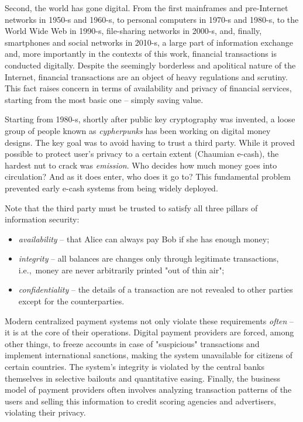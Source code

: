 Second, the world has gone digital.
From the first mainframes and pre-Internet networks in 1950-s and 1960-s, to personal computers in 1970-s and 1980-s, to the World Wide Web in 1990-s, file-sharing networks in 2000-s, and, finally, smartphones and social networks in 2010-s, a large part of information exchange and, more importantly in the contexts of this work, financial transactions is conducted digitally.
Despite the seemingly borderless and apolitical nature of the Internet, financial transactions are an object of heavy regulations and scrutiny.
This fact raises concern in terms of availability and privacy of financial services, starting from the most basic one -- simply saving value.

Starting from 1980-s, shortly after public key cryptography was invented, a loose group of people known as \textit{cypherpunks} has been working on digital money designs.
The key goal was to avoid having to trust a third party.
While it proved possible to protect user's privacy to a certain extent (Chaumian e-cash), the hardest nut to crack was \textit{emission}.
Who decides how much money goes into circulation?
And as it does enter, who does it go to?
This fundamental problem prevented early e-cash systems from being widely deployed.

Note that the third party must be trusted to satisfy all three pillars of information security:

\begin{itemize}
	\item \textit{availability} -- that Alice can always pay Bob if she has enough money;
	\item \textit{integrity} -- all balances are changes only through legitimate transactions, i.e.,~money are never arbitrarily printed "out of thin air";
	\item \textit{confidentiality} -- the details of a transaction are not revealed to other parties except for the counterparties.
\end{itemize}

Modern centralized payment systems not only violate these requirements \textit{often} -- it is at the core of their operations.
Digital payment providers are forced, among other things, to freeze accounts in case of "suspicious" transactions and implement international sanctions, making the system unavailable for citizens of certain countries.
The system's integrity is violated by the central banks themselves in selective bailouts and quantitative easing.
Finally, the business model of payment providers often involves analyzing transaction patterns of the users and selling this information to credit scoring agencies and advertisers, violating their privacy.

